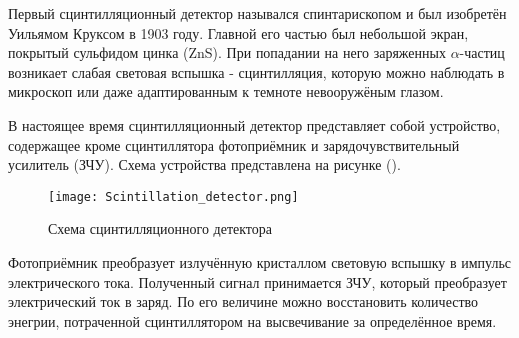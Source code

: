 Первый сцинтилляционный детектор назывался спинтарископом и был изобретён Уильямом Круксом в 1903 году. Главной его частью был небольшой экран, покрытый сульфидом цинка (ZnS). При попадании на него заряженных $\alpha$-частиц возникает слабая световая вспышка - сцинтилляция, которую можно наблюдать в микроскоп или даже адаптированным к темноте невооружёным глазом.\par
В настоящее время сцинтилляционный детектор представляет собой устройство, содержащее кроме сцинтиллятора фотоприёмник и зарядочувствительный усилитель (ЗЧУ). Схема устройства представлена на рисунке ().\par
\begin{figure}[ht]
    \centering
    \texttt{[image: Scintillation\_detector.png]}
    \caption{Схема сцинтилляционного детектора}
    \label{fig:mpr}
\end{figure}
Фотоприёмник преобразует излучённую кристаллом световую вспышку в импульс электрического тока. Полученный сигнал принимается ЗЧУ, который преобразует электрический ток в заряд. По его величине можно восстановить количество энегрии, потраченной сцинтиллятором на высвечивание за определённое время.
